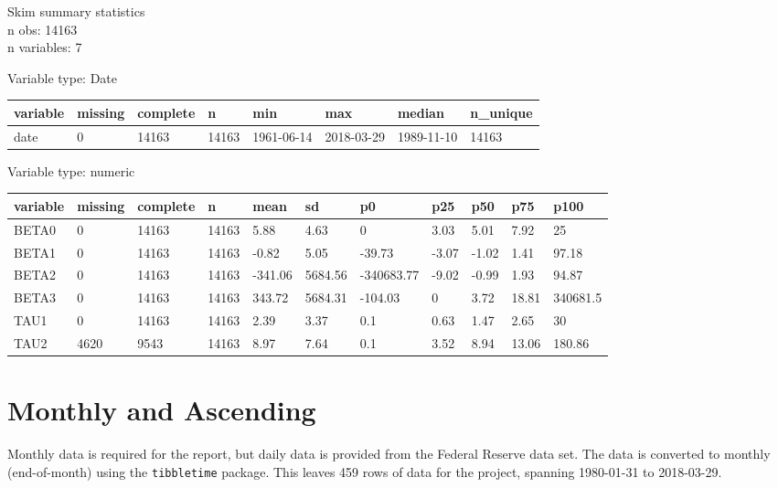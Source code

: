 \documentclass[openany]{book}
\theoremstyle{definition}
\theoremstyle{definition}
\theoremstyle{definition}
\theoremstyle{remark}
\begin{document}
\small

Skim summary statistics\\
n obs: 14163\\
n variables: 7

Variable type: Date

\begin{tabular}{llllllll}
\toprule
variable & missing & complete & n & min & max & median & n\_unique\\
\midrule
date & 0 & 14163 & 14163 & 1961-06-14 & 2018-03-29 & 1989-11-10 & 14163\\
\bottomrule
\end{tabular}

Variable type: numeric

\begin{tabular}{lllllllllll}
\toprule
variable & missing & complete & n & mean & sd & p0 & p25 & p50 & p75 & p100\\
\midrule
BETA0 & 0 & 14163 & 14163 & 5.88 & 4.63 & 0 & 3.03 & 5.01 & 7.92 & 25\\
BETA1 & 0 & 14163 & 14163 & -0.82 & 5.05 & -39.73 & -3.07 & -1.02 & 1.41 & 97.18\\
BETA2 & 0 & 14163 & 14163 & -341.06 & 5684.56 & -340683.77 & -9.02 & -0.99 & 1.93 & 94.87\\
BETA3 & 0 & 14163 & 14163 & 343.72 & 5684.31 & -104.03 & 0 & 3.72 & 18.81 & 340681.5\\
TAU1 & 0 & 14163 & 14163 & 2.39 & 3.37 & 0.1 & 0.63 & 1.47 & 2.65 & 30\\
TAU2 & 4620 & 9543 & 14163 & 8.97 & 7.64 & 0.1 & 3.52 & 8.94 & 13.06 & 180.86\\
\bottomrule
\end{tabular}

\normalsize

\hypertarget{monthly}{%
\section{Monthly and Ascending}\label{monthly}}

\small

\normalsize

Monthly data is required for the report, but daily data is provided from
the Federal Reserve data set. The data is converted to monthly
(end-of-month) using the \texttt{tibbletime} package. This leaves 459
rows of data for the project, spanning 1980-01-31 to 2018-03-29.

\small

\normalsize
\end{document}
